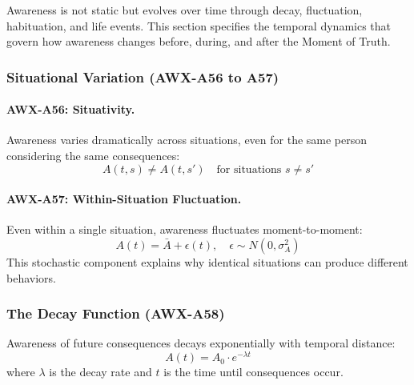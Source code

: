 
Awareness is not static but evolves over time through decay, fluctuation, 
habituation, and life events. This section specifies the temporal dynamics 
that govern how awareness changes before, during, and after the Moment of Truth.

\subsubsection{Situational Variation (AWX-A56 to A57)}

\paragraph{AWX-A56: Situativity.}
Awareness varies dramatically across situations, even for the same person 
considering the same consequences:
\begin{equation}
A(t, s) \neq A(t, s') \quad \text{for situations } s \neq s'
\end{equation}

\paragraph{AWX-A57: Within-Situation Fluctuation.}
Even within a single situation, awareness fluctuates moment-to-moment:
\begin{equation}
A(t) = \bar{A} + \epsilon(t), \quad \epsilon \sim N(0, \sigma^2_A)
\end{equation}
This stochastic component explains why identical situations can produce 
different behaviors.

\subsubsection{The Decay Function (AWX-A58)}

\begin{axiom}
Awareness of future consequences decays exponentially with temporal distance:
\begin{equation}
A(t) = A_0 \cdot e^{-\lambda t}
\label{eq:temporal-decay}
\end{equation}
where $\lambda$ is the decay rate and $t$ is the time until consequences occur.
\end{axiom}

